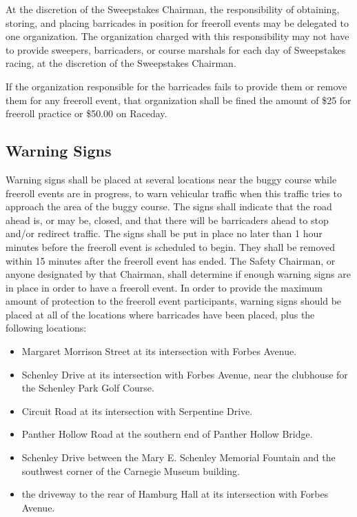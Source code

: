 	At the discretion of the Sweepstakes Chairman, the responsibility of obtaining,
	storing, and placing barricades in position for freeroll events may be
	delegated to one organization. The organization charged with this
	responsibility may not have to provide sweepers, barricaders, or course marshals
	for each day of Sweepstakes racing, at the discretion of the Sweepstakes
	Chairman.

	If the organization responsible for the barricades fails to provide them or
	remove them for any freeroll event, that organization shall be fined
	the amount of \$25 for freeroll practice or \$50.00 on Raceday.

	
\subsection{Warning Signs}

	Warning signs shall be placed at several locations near the buggy course while
	freeroll events are in progress, to warn vehicular traffic when this traffic
	tries to approach the area of the buggy course. The signs shall indicate that
	the road ahead is, or may be, closed, and that there will be barricaders ahead to
	stop and/or redirect traffic. The signs shall be put in place no later than 1 hour
	minutes before the freeroll event is scheduled to begin. They shall be
	removed within 15 minutes after the freeroll event has ended. The Safety
	Chairman, or anyone designated by that Chairman, shall determine if enough
	warning signs are in place in order to have a freeroll event. In order to
	provide the maximum amount of protection to the freeroll event participants,
	warning signs should be placed at all of the locations where barricades have
	been placed, plus the following locations:

	\begin{itemize}
		\item Margaret Morrison Street at its intersection with Forbes Avenue.
		\item Schenley Drive at its intersection with Forbes Avenue, near the clubhouse for the Schenley Park Golf Course.
		\item Circuit Road at its intersection with Serpentine Drive.
		\item Panther Hollow Road at the southern end of Panther Hollow Bridge.
		\item Schenley Drive between the Mary E. Schenley Memorial Fountain and the southwest corner of the Carnegie Museum building.
		\item the driveway to the rear of Hamburg Hall at its intersection with Forbes Avenue.
	\end{itemize}

